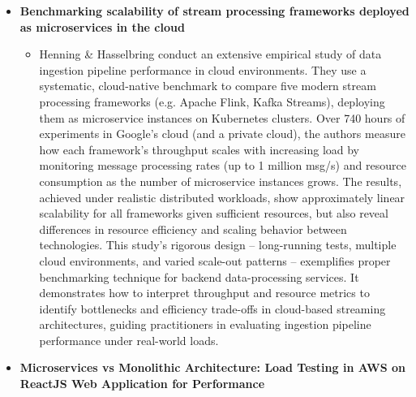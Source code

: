 \documentclass[11pt]{article}
\begin{document}
\begin{itemize}
\begin{itemize}
    \end{itemize}
    \item[] \textbf{Benchmarking scalability of stream processing frameworks deployed as microservices in the cloud}
    \begin{itemize}
        \item[] Henning & Hasselbring conduct an extensive empirical study of data ingestion pipeline performance in cloud environments. They use a systematic, cloud-native benchmark to compare five modern stream processing frameworks (e.g. Apache Flink, Kafka Streams), deploying them as microservice instances on Kubernetes clusters. Over 740 hours of experiments in Google’s cloud (and a private cloud), the authors measure how each framework’s throughput scales with increasing load by monitoring message processing rates (up to 1 million msg/s) and resource consumption as the number of microservice instances grows. The results, achieved under realistic distributed workloads, show approximately linear scalability for all frameworks given sufficient resources, but also reveal differences in resource efficiency and scaling behavior between technologies. This study’s rigorous design – long-running tests, multiple cloud environments, and varied scale-out patterns – exemplifies proper benchmarking technique for backend data-processing services. It demonstrates how to interpret throughput and resource metrics to identify bottlenecks and efficiency trade-offs in cloud-based streaming architectures, guiding practitioners in evaluating ingestion pipeline performance under real-world loads.
    \end{itemize}
    \item[] \textbf{Microservices vs Monolithic Architecture: Load Testing in AWS on ReactJS Web Application for Performance}
    \begin{itemize}

\end{itemize}
\end{itemize}
\end{document}
